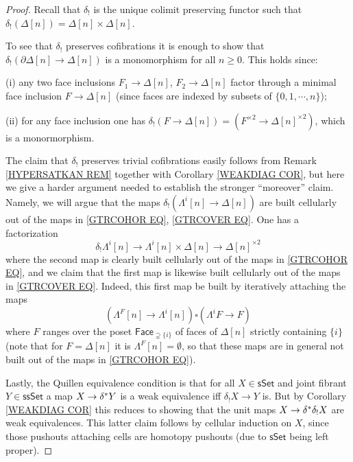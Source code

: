 \documentclass[a4paper,10pt
,draft
]{article}%
\begin{document}
\begin{proof}
	Recall that $\delta_!$ is the unique colimit preserving functor such that 
	$\delta_!(\Delta[n])=\Delta[n] \times \Delta[n]$.

	To see that $\delta_!$ preserves cofibrations 
	it is enough to show that 
	$\delta_{!}\left( \partial \Delta[n] \to \Delta[n]\right)$
	is a monomorphism for all $n\geq 0$.
	This holds since:
\begin{inparaenum}
	\item[(i)] any two face inclusions $F_1 \to \Delta[n]$, $F_2 \to \Delta[n]$ factor through a minimal face inclusion $F \to \Delta[n]$ (since faces are indexed by subsets of $\{0,1,\cdots,n\}$); 
	\item[(ii)] for any face inclusion one has 
		$\delta_{!}\left( F \to \Delta[n]\right) = 
		\left(F^{\times 2} \to \Delta[n]^{\times 2} \right)$, which is a monormorphism.
\end{inparaenum}

The claim that $\delta_!$ preserves trivial cofibrations easily follows from Remark \ref{HYPERSATKAN REM} together with Corollary \ref{WEAKDIAG COR}, but here we give a harder argument needed to establish the stronger ``moreover'' claim.
Namely, we will argue that the maps
$\delta_! \left( \Lambda^i[n] \to \Delta[n]\right)$
are built cellularly out of the maps in 
\eqref{GTRCOHOR EQ}, \eqref{GTRCOVER EQ}.
One has a factorization
\[
	\delta_! \Lambda^i[n] \to
	\Lambda^i[n] \times \Delta[n] \to \Delta[n]^{\times 2}
\]
where the second map is clearly built cellularly out of the maps in 
\eqref{GTRCOHOR EQ}, and we claim that 
the first map is likewise built cellularly out of the maps in \eqref{GTRCOVER EQ}.
Indeed, this first map be built by iteratively attaching the maps
\[
	\left(\Lambda^{F}[n] \to \Lambda^i[n] \right)
		\square
	\left(\Lambda^{i}F \to F \right)
\]
where $F$ ranges over the poset $\mathsf{Face}_{\supsetneq \{i\}}$
of faces of $\Delta[n]$ strictly containing $\{i\}$ 
(note that for $F=\Delta[n]$ it is $\Lambda^F[n]=\emptyset$, so that these maps are in general not built out of the maps in \eqref{GTRCOHOR EQ}). 

Lastly, the Quillen equivalence condition 
is that for all $X \in \mathsf{sSet}$ and joint fibrant
$Y \in \mathsf{ssSet}$ a map
$X \to \delta^{\**} Y$ is a weak equivalence iff 
$\delta_!X \to Y$ is. 
But by Corollary \ref{WEAKDIAG COR}
this reduces to showing
that the unit maps $X \to \delta^{\**} \delta_! X$
are weak equivalences. This latter claim follows by cellular induction on $X$, since those pushouts attaching cells are homotopy pushouts (due to $\mathsf{sSet}$ being left proper).
\end{proof}
\end{document}
